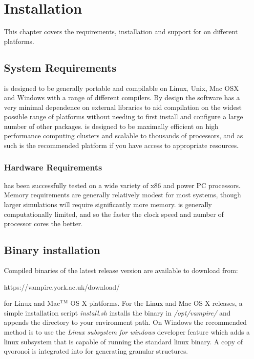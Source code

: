 \chapter{Installation}\label{chap:installation}

This chapter covers the requirements, installation and support for \vampire on different platforms. 

\section*{System Requirements}
\vampire is designed to be generally portable and compilable on Linux, Unix, Mac OSX and Windows with a range of different compilers. By design the software has a very minimal dependence on external libraries to aid compilation on the widest possible range of platforms without needing to first install and configure a large number of other packages. \vampire is designed to be maximally efficient on high performance computing clusters and scalable to thousands of processors, and as such is the recommended platform if you have access to appropriate resources. 

\subsection*{Hardware Requirements}
\vampire has been successfully tested on a wide variety of x86 and power PC processors. Memory requirements are generally relatively modest for most systems, though larger simulations will require significantly more memory. \vampire is generally computationally limited, and so the faster the clock speed and number of processor cores the better.

\section*{Binary installation}
Compiled binaries of the latest release version are available to download from:

\noindent
\begin{minipage}[c]{\textwidth}
\centering
https://vampire.york.ac.uk/download/
\end{minipage}

\noindent for Linux and Mac$^{\mathrm{TM}}$ OS X platforms. For the Linux and Mac OS X releases, a simple installation script \textit{install.sh} installs the binary in \textit{/opt/vampire/} and appends the directory to your environment path. On Windows the recommended method is to use the \textit{Linux subsystem for windows} developer feature which adds a linux subsystem that is capable of running the standard linux binary. A copy of qvoronoi is integrated into \vampire for generating granular structures. 

